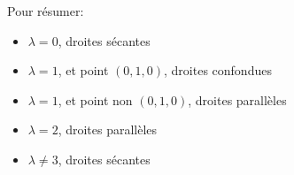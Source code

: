 \documentclass[]{book}
\theoremstyle{definition}
\begin{document}
Pour r\'esumer:
\begin{itemize}
    \item $\lambda = 0$, droites s\'ecantes
    \item $\lambda = 1$, et point $(0,1,0)$, droites confondues
    \item $\lambda = 1$, et point non $(0,1,0)$, droites parall\`eles
    \item $\lambda = 2$, droites parall\`eles
    \item $\lambda \neq 3$, droites s\'ecantes
\end{itemize}
\end{document}
